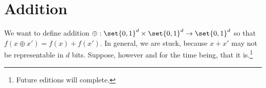 \section*{Addition}



We want to define addition $\oplus: \set{0, 1}^d \times \set{0, 1}^d \to \set{0, 1}^d$ so that $f(x \oplus x') = f(x) + f(x')$.
In general, we are stuck, because $x + x'$ may not be representable in $d$ bits.
Suppose, however and for the time being, that it is.\footnote{Future editions will complete.}
